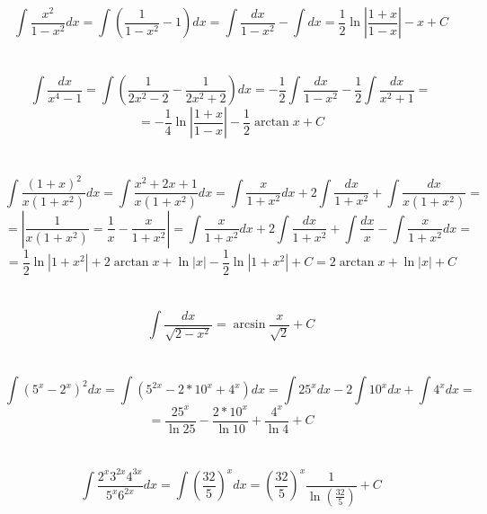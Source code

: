 \documentclass{article}
\begin{document}
\begin{center}
        \section{}
            \[\int \frac{x^2}{1 - x^2}dx = \int \left(\frac{1}{1-x^2} - 1
            \right)dx = \int \frac{dx}{1 - x^2} - \int dx = 
            \frac{1}{2} \ln{\left| \frac{1 + x}{1 - x} \right|} - x + C\]

        \section{}
            \[\int \frac{dx}{x^4 - 1} = \int \left(\frac{1}{2x^2 - 2}
            - \frac{1}{2x^2 + 2}\right)dx = - \frac{1}{2} \int \frac{dx}{1 - x^2}
            - \frac{1}{2} \int \frac{dx}{x^2 + 1} =\] 
            \[= - \frac{1}{4} \ln{\left| \frac{1 + x}{1 - x} \right|} -
            \frac{1}{2} \arctan{x} + C\]

        \section{}
            \[\int \frac{(1 + x)^2}{x(1 + x^2)}dx = \int 
            \frac{x^2 + 2x + 1}{x(1 + x^2)}dx = \int \frac{x}{1 + x^2}dx
            + 2 \int \frac{dx}{1 + x^2} + \int \frac{dx}{x(1 + x^2)} =\]
            \[= \left| \frac{1}{x(1 + x^2)} = \frac{1}{x} - \frac{x}{1 + x^2}
            \right| = \int \frac{x}{1 + x^2}dx + 2 \int \frac{dx}{1 + x^2} +
            \int \frac{dx}{x} - \int \frac{x}{1 + x^2}dx =\]
            \[= \frac{1}{2} \ln{|1 + x^2|} + 2 \arctan{x} + \ln{|x|}
            - \frac{1}{2} \ln{|1 + x^2|} + C = 2 \arctan{x} + \ln{|x|} + C\]

        \section{}
            \[\int \frac{dx}{\sqrt{2 - x^2}} = \arcsin{\frac{x}{\sqrt{2}} + C}\]
            
        \section{}
            \[\int (5^x - 2^x)^2 dx = \int (5^{2x} - 2 * 10^x + 4^x)dx =
            \int 25^x dx - 2 \int 10^x dx + \int 4^x dx = \] 
            \[= \frac{25^x}{\ln{25}} - \frac{2 * 10^x}{\ln{10}} + 
            \frac{4^x}{\ln{4}} + C\]    

        \section{}
            \[\int \frac{2^x 3^{2x} 4^{3x}}{5^x 6^{2x}}dx = \int
            \left(\frac{32}{5}\right)^x dx = \left(\frac{32}{5}\right)^x
            \frac{1}{\ln{\left(\frac{32}{5}\right)}} + C\]
            

\end{center}
\end{document}
